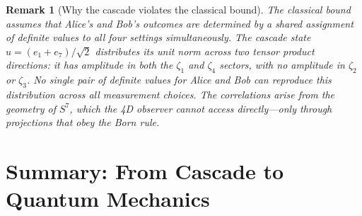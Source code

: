 \documentclass[12pt,a4paper]{article}
\newtheorem{remark}[theorem]{Remark}
\begin{document}
\begin{remark}[Why the cascade violates the classical bound]
The classical bound assumes that Alice's and Bob's outcomes are determined by a shared
assignment of definite values to all four settings simultaneously. The cascade state
$u=(e_1+e_7)/\sqrt{2}$ distributes its unit norm across two tensor product directions:
it has amplitude in both the $\zeta_1$ and $\zeta_4$ sectors, with no amplitude in
$\zeta_2$ or $\zeta_3$. No single pair of definite values for Alice and Bob can
reproduce this distribution across all measurement choices. The correlations arise from
the geometry of $S^7$, which the 4D observer cannot access directly---only through
projections that obey the Born rule.
\end{remark}

\section{Summary: From Cascade to Quantum Mechanics}\label{sec:summary-from-cascade-to-quantum-mechanic}
\end{document}
